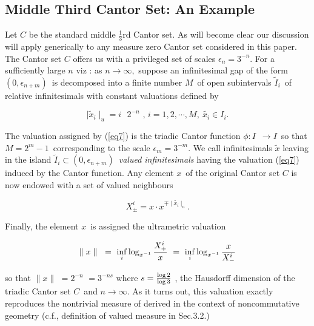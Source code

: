 \documentclass[12pt]{article}
\begin{document}
\subsection{Middle Third Cantor Set: An Example}

Let $C$ be the standard middle $\frac{1}{3}$rd Cantor set. As will become
clear our discussion will apply generically to any measure zero Cantor set
considered in this paper. The Cantor set $C$ offers us with a privileged
set of scales $\epsilon _{n}=3^{-n}$. For a sufficiently large $n$ viz : as $
n\rightarrow \infty,$ suppose an infinitesimal gap of the form $(0,\epsilon _{n+m})$\
is decomposed into  a finite number $M$\ of open subintervals $\tilde I_{i}$\ of
relative infinitesimals with constant valuations defined by

\begin{equation}\label{eq7}
\mid \tilde{x}_{i}\mid _{u}=i\text{ }2^{-n}\text{ , }i=1,2,\cdots ,M, \ \tilde{x_i}\in I_{i}.
\end{equation}

\noindent The valuation assigned by (\ref{eq7}) is the triadic
Cantor function $\phi :I$\ $\rightarrow I$\ so that $M=2^{m}-1$\ corresponding to the scale $\epsilon _{m}=3^{-m}$. We call infinitesimals $\tilde{x}$ leaving in the island $\tilde I_{i}\subset (0,\epsilon _{n+m})$\  \emph{valued infinitesimals} having the valuation (\ref{eq7}) induced by the Cantor function. Any element $x$\ of the
original Cantor set $C$ is now endowed with a set of valued neighbours

\begin{equation}\label{eq8}
X_{\pm }^{i}=x \cdot x^{\mp \mid \tilde{x_i}\mid _{u}}.
\end{equation}

Finally, the element $x$\ is assigned the ultrametric valuation

\begin{equation}\label{eq9}
\parallel x\parallel \text{ }=\text{ }\underset{i}{\inf }\log _{x^{-1}}\frac{%
X_{+}^{i}}{x}\text{ }=\text{ }\underset{i}{\inf }\log _{x^{-1}}\frac{x}{%
X_{-}^{i}}
\end{equation}

\noindent so that $\parallel x\parallel $ $=2^{-n}$ $=3^{-ns}$ where $s=\frac{%
\log 2}{\log 3}$ , the Hausdorff dimension of the triadic Cantor set $C$\
and $n\rightarrow \infty $. As it turns out, this valuation exactly reproduces the 
nontrivial measure of \cite{pb} derived in the context of noncommutative geometry (c.f.,
definition of valued measure in Sec.3.2.) 
\end{document}
